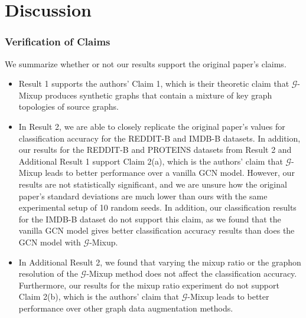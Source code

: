 \section{Discussion}\label{sec:discussion}

\subsubsection*{Verification of Claims}
We summarize whether or not our results support the original paper's claims.
\begin{itemize}
    \item Result 1 supports the authors' Claim 1, which is their theoretic claim that $\mathcal{G}$-Mixup produces synthetic graphs that contain a mixture of key graph topologies of source graphs.
    \item In Result 2, we are able to closely replicate the original paper's values for classification accuracy for the REDDIT-B and IMDB-B datasets. In addition, our results for the REDDIT-B and PROTEINS datasets from Result 2 and Additional Result 1 support Claim 2(a), which is the authors' claim that $\mathcal{G}$-Mixup leads to better performance over a vanilla GCN model. However, our results are not statistically significant, and we are unsure how the original paper's standard deviations are much lower than ours with the same experimental setup of 10 random seeds. In addition, our classification results for the IMDB-B dataset do not support this claim, as we found that the vanilla GCN model gives better classification accuracy results than does the GCN model with $\mathcal{G}$-Mixup.
    \item In Additional Result 2, we found that varying the mixup ratio or the graphon resolution of the $\mathcal{G}$-Mixup method does not affect the classification accuracy. Furthermore, our results for the mixup ratio experiment do not support Claim 2(b), which is the authors' claim that $\mathcal{G}$-Mixup leads to better performance over other graph data augmentation methods.
\end{itemize}

